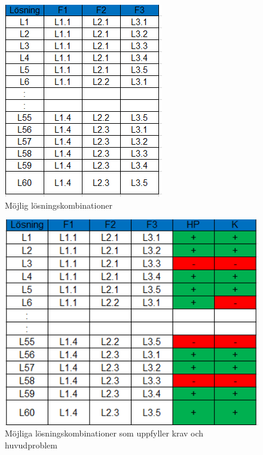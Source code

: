 \documentclass[11pt, a4paper]{report}
\begin{document}
\begin{figure}[H]
	\begin{center}
		\includegraphics [angle=0]{Losningsforslag.png}
		\caption{Möjlig lösningskombinationer }
		\label{fig:mojligalosningar}
	\end{center}
\end{figure}


\begin{figure}[H]
	\begin{center}
		\includegraphics [width=12cm,angle=0]{HPK.png}
		\caption{Möjliga lösningskombinationer som uppfyller krav och huvudproblem }
		\label{fig:hpk}
	\end{center}
\end{figure}
\end{document}
